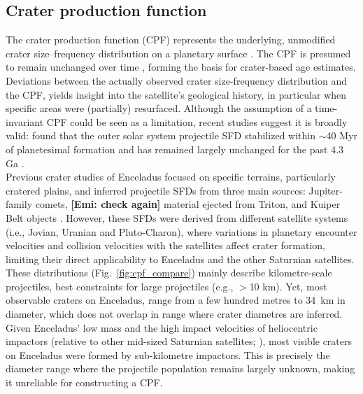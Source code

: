 \documentclass[preprint,11pt,3p,times,authoryear]{elsarticle}
\begin{document}
\subsection{Crater production function}
\label{sub:intro_cpf}
The crater production function (CPF) represents the underlying, unmodified crater size–frequency distribution on a planetary surface \citep{Neukum1975}. The CPF is presumed to remain unchanged over time \citep{Neukum1975,Neukum1983,Werner2014,Werner2023}, forming the basis for crater-based age estimates. Deviations between the actually observed crater size-frequency distribution and the CPF, yields insight into the satellite's geological history, in particular when specific areas were (partially) resurfaced. Although the assumption of a time-invariant CPF could be seen as a limitation, recent studies suggest it is broadly valid: \citet{Bottke2024} found that the outer solar system projectile SFD stabilized within $\sim$40 Myr of planetesimal formation and has remained largely unchanged for the past 4.3 Ga \citep{Bottke2024}.\\

Previous crater studies of Enceladus focused on specific terrains, particularly cratered plains, and inferred projectile SFDs from three main sources: 
Jupiter-family comets, 
\textbf{[Emi: check again]} material ejected from Triton, %
and Kuiper Belt objects \citep{Zahnle2003, Singer2019, Bottke2024}. 
However, these SFDs were derived from different satellite systems (i.e., Jovian, Uranian and Pluto-Charon), where variations in planetary encounter velocities and collision velocities with the satellites affect crater formation, limiting their direct applicability to Enceladus and the other Saturnian satellites. \\

These distributions (Fig.~\ref{fig:cpf_compare}) mainly describe kilometre-scale projectiles, best constraints for large projectiles (e.g., $>$10 km). Yet, most observable craters on Enceladus, range from a few hundred metres to 34~km in diameter, which does not overlap in range where crater diametres are inferred. Given Enceladus’ low mass and the high impact velocities of heliocentric impactors (relative to other mid-sized Saturnian satellites; \citealt{Zahnle2003, Wong2021}), most visible craters on Enceladus were formed by sub-kilometre impactors. This is precisely the diameter range where the projectile population remains largely unknown, making it unreliable for constructing a CPF. \\
\end{document}
